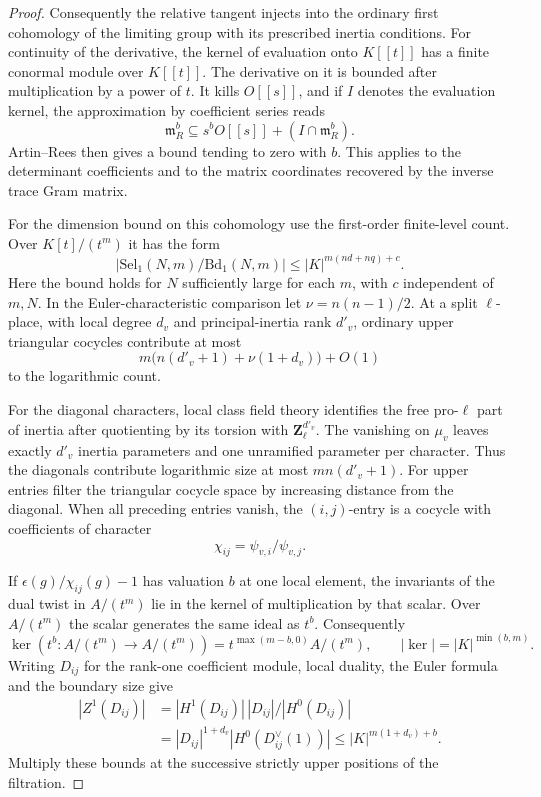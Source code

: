 \begin{proof}
Consequently the relative tangent injects into the
ordinary first cohomology of the limiting group with
its prescribed inertia conditions. For continuity of
the derivative, the kernel of evaluation onto \(K[[t]]\)
has a finite conormal module over \(K[[t]]\). The
derivative on it is bounded after multiplication by a
power of \(t\). It kills \(O[[s]]\), and if \(I\) denotes the evaluation kernel, the approximation by coefficient series reads
\[
 \mathfrak m_R^b\subseteq s^bO[[s]]+(I\cap\mathfrak m_R^b).
\]
Artin--Rees then gives a bound
tending to zero with \(b\). This applies to the
determinant coefficients and to the matrix coordinates
recovered by the inverse trace Gram matrix.


For the dimension bound on this cohomology use the
first-order finite-level count. Over \(K[t]/(t^m)\)
it has the form
\[
 \bigl|\mathrm{Sel}_1(N,m)/\mathrm{Bd}_1(N,m)\bigr|
     \le |K|^{m(nd+nq)+c}.
\]
Here the bound holds for \(N\) sufficiently large for
each \(m\), with \(c\) independent of \(m,N\).
In the Euler-characteristic comparison let
\(\nu=n(n-1)/2\). At a split \(\ell\)-place, with
local degree \(d_v\) and principal-inertia rank
\(d'_v\), ordinary upper triangular cocycles contribute
at most
\[
 m\bigl(n(d'_v+1)+\nu(1+d_v)\bigr)+O(1)
\]
to the logarithmic count.

For the diagonal characters,
local class field theory identifies the free pro-\(\ell\)
part of inertia after quotienting by its torsion with
\(\mathbf Z_\ell^{d'_v}\). The vanishing on \(\mu_v\) leaves exactly \(d'_v\) inertia
parameters and one unramified parameter per character. Thus the
diagonals contribute logarithmic size at most \(mn(d'_v+1)\). For
upper entries filter the triangular cocycle space by
increasing distance from the diagonal. When all
preceding entries vanish, the \((i,j)\)-entry is a
cocycle with coefficients of character
\[
 \chi_{ij}=\psi_{v,i}/\psi_{v,j}.
\]

If \(\epsilon(g)/\chi_{ij}(g)-1\) has valuation \(b\)
at one local element, the invariants of the dual twist in
\(A/(t^m)\) lie in the kernel of multiplication by that scalar.
Over \(A/(t^m)\) the scalar generates the same ideal as \(t^b\). Consequently
\[
 \ker(t^b:A/(t^m)\to A/(t^m))=t^{\max(m-b,0)}A/(t^m),\qquad
 |\ker|=|K|^{\min(b,m)} .
\]
Writing \(D_{ij}\) for the rank-one coefficient module,
local duality, the Euler formula and the boundary size give
\[
 \begin{aligned}
 |Z^1(D_{ij})|
  &= |H^1(D_{ij})|\,|D_{ij}|/|H^0(D_{ij})|\\
  &= |D_{ij}|^{1+d_v}|H^0(D_{ij}^{\vee}(1))|
   \le |K|^{m(1+d_v)+b}.
 \end{aligned}
\]
Multiply these bounds at the successive strictly upper
positions of the filtration.


\end{proof}
